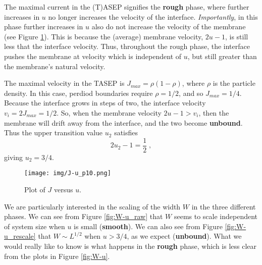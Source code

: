 \documentclass[a4paper,10pt]{article}
\newcommand{\fref}[1]{Figure \ref{#1}}
\begin{document}
The maximal current in the (T)ASEP signifies the {\bf rough} phase, where further increases in $u$ no longer increases the velocity of the interface. \emph{Importantly}, in this phase further increases in $u$ also do not increase the velocity of the membrane (see \fref{fig:J-u}). This is because the (average) membrane velocity, $2u-1$, is still less that the interface velocity. Thus, throughout the rough phase, the interface pushes the membrane at velocity which is independent of $u$, but still greater than the membrane's natural velocity.

The maximal velocity in the TASEP is $J_{max} = \rho(1-\rho)$, where $\rho$ is the particle density. In this case, perdiod boundaries require $\rho = 1/2$, and so $J_{max}=1/4$. Because the interface grows in steps of two, the interface velocity $v_i = 2J_{max} = 1/2$. So, when the membrane velocity $2u-1 > v_i$, then the membrane will drift away from the interface, and the two become {\bf unbound}. Thus the upper transition value $u_2$ satisfies
\begin{equation*}
  2u_2 - 1 = \frac{1}{2} \;,
\end{equation*}
giving $u_2 = 3/4$.

\begin{figure}[h!]
  \centering
  \texttt{[image: img/J-u\_p10.png]}
  \caption{Plot of $J$ versus $u$.}
  \label{fig:J-u}
\end{figure}

We are particularly interested in the scaling of the width $W$ in the three different phases. We can see from \fref{fig:W-u_raw} that $W$ seems to scale independent of system size when $u$ is small ({\bf smooth}). We can also see from \fref{fig:W-u_rescale} that $W \sim L^{1/2}$ when $u > 3/4$, as we expect ({\bf unbound}). What we would really like to know is what happens in the {\bf rough} phase, which is less clear from the plots in \fref{fig:W-u}.
\end{document}
